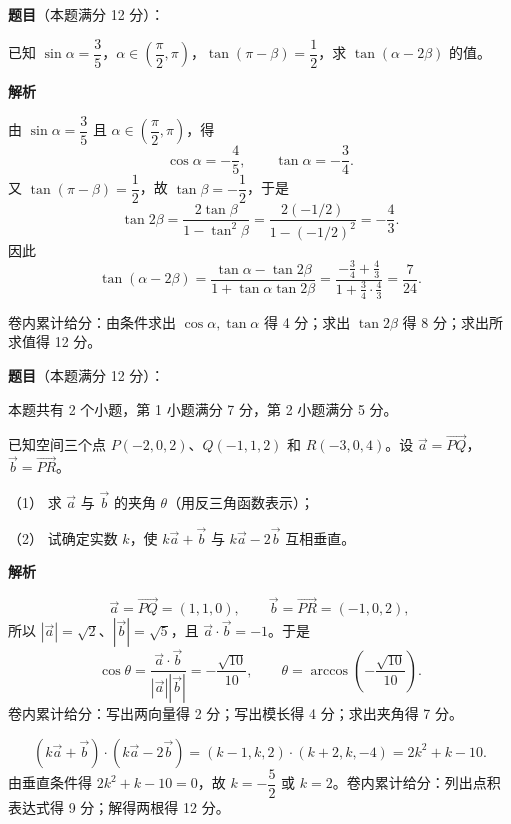 \begin{answer}

\textbf{题目}（本题满分 12 分）：

已知 $\sin\alpha=\dfrac35$，$\alpha\in\left(\dfrac\pi2,\pi\right)$，$\tan(\pi-\beta)=\dfrac12$，求 $\tan(\alpha-2\beta)$ 的值。

\textbf{解析}

由 $\sin\alpha=\dfrac35$ 且 $\alpha\in(\dfrac\pi2,\pi)$，得
\nopagebreak[4]
\[
\cos\alpha=-\frac45,\qquad \tan\alpha=-\frac34.
\]
又 $\tan(\pi-\beta)=\dfrac12$，故 $\tan\beta=-\dfrac12$，于是
\nopagebreak[4]
\[
\tan2\beta=\frac{2\tan\beta}{1-\tan^2\beta}
=\frac{2(-1/2)}{1-(-1/2)^2}=-\frac43.
\]
因此
\nopagebreak[4]
\[
\tan(\alpha-2\beta)=\frac{\tan\alpha-\tan2\beta}{1+\tan\alpha\tan2\beta}
=\frac{-\frac34+\frac43}{1+\frac34\cdot\frac43}=\frac7{24}.
\]

卷内累计给分：由条件求出 $\cos\alpha,\tan\alpha$ 得 4 分；求出 $\tan2\beta$ 得 8 分；求出所求值得 12 分。


\end{answer}
\begin{answer}

\textbf{题目}（本题满分 12 分）：

本题共有 2 个小题，第 1 小题满分 7 分，第 2 小题满分 5 分。

已知空间三个点 $P(-2,0,2)$、$Q(-1,1,2)$ 和 $R(-3,0,4)$。设 $\vec a=\overrightarrow{PQ}$，$\vec b=\overrightarrow{PR}$。

（1） 求 $\vec a$ 与 $\vec b$ 的夹角 $\theta$（用反三角函数表示）；

（2） 试确定实数 $k$，使 $k\vec a+\vec b$ 与 $k\vec a-2\vec b$ 互相垂直。

\textbf{解析}


\nopagebreak[4]
\[
\vec a=\overrightarrow{PQ}=(1,1,0),\qquad
\vec b=\overrightarrow{PR}=(-1,0,2),
\]
所以 $|\vec a|=\sqrt2$、$|\vec b|=\sqrt5$，且 $\vec a\cdot\vec b=-1$。于是
\nopagebreak[4]
\[
\cos\theta=\frac{\vec a\cdot\vec b}{|\vec a||\vec b|}
=-\frac{\sqrt{10}}{10},\qquad
\theta=\arccos\left(-\frac{\sqrt{10}}{10}\right).
\]
卷内累计给分：写出两向量得 2 分；写出模长得 4 分；求出夹角得 7 分。


\nopagebreak[4]
\[
(k\vec a+\vec b)\cdot(k\vec a-2\vec b)
=(k-1,k,2)\cdot(k+2,k,-4)
=2k^2+k-10.
\]
由垂直条件得 $2k^2+k-10=0$，故 $k=-\dfrac52$ 或 $k=2$。卷内累计给分：列出点积表达式得 9 分；解得两根得 12 分。



\end{answer}
